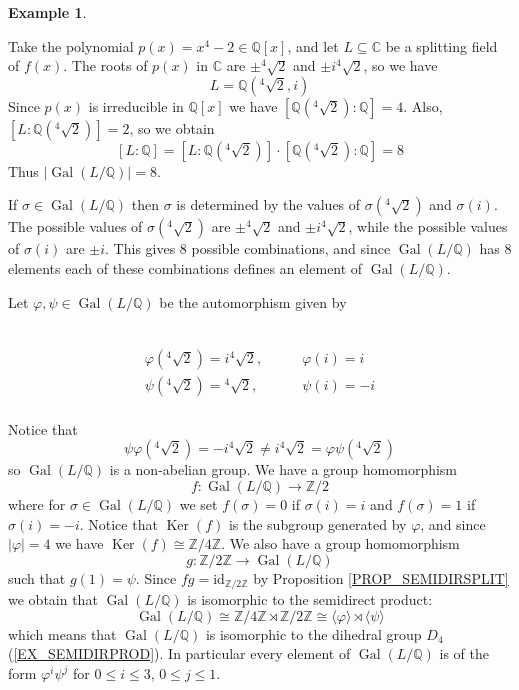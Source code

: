 \documentclass[12pt, letterpaper, oneside]{article}
\theoremstyle{plain}
\theoremstyle{definition}
\newtheorem{example}[theorem]{Example}
\newcommand{\Z}{{\mathbb Z}}
\newcommand{\Q}{{\mathbb Q}}
\newcommand{\C}{{\mathbb C}}
\newcommand{\id}{\mathrm{id}}
\newcommand{\Ker}{\operatorname{Ker}}
\newcommand{\subgp}[1]{\langle#1\rangle}
\newcommand{\Gal}{\operatorname{Gal}}
\newcommand{\vs}{\vskip 5mm}
\begin{document}
\vs\vs

\begin{example} \ 

Take the polynomial $p(x) = x^{4} -2 \in \Q[x]$, and let $L\subseteq \C$ be a splitting field of $f(x)$. 
The roots of $p(x)$ in $\C$ are $\pm ^{4}\!\!\sqrt{2}$ and $\pm i ^{4}\!\!\sqrt{2}$, so we have 
$$L= \Q(^{4}\!\!\sqrt{2}, i)$$
Since $p(x)$ is irreducible in $\Q[x]$ we have $[\Q(^{4}\!\!\sqrt{2}):\Q] =4$. Also, 
$[L : \Q(^{4}\!\!\sqrt{2})] =2$, so we obtain 
$$[L:\Q] = [L : \Q(^{4}\!\!\sqrt{2})] \cdot [\Q(^{4}\!\!\sqrt{2}):\Q] = 8$$
Thus $|\Gal(L/\Q)| = 8$. 

If $\sigma\in \Gal(L/\Q)$ then $\sigma$ is determined by the values of $\sigma( ^{4}\!\!\sqrt{2})$
and $\sigma(i)$. The possible values of $\sigma( ^{4}\!\!\sqrt{2})$ are $\pm  ^{4}\!\!\sqrt{2}$
and $\pm i  ^{4}\!\!\sqrt{2}$, while the possible values of $\sigma(i)$ are $\pm i$. 
This gives 8 possible combinations, and since $\Gal(L/\Q)$ has 8 elements each of these 
combinations defines an element of $\Gal(L/\Q)$. 

Let $\varphi, \psi\in \Gal(L/\Q)$ be the automorphism given by 

\vskip -10mm


\ 
\begin{align*}
\varphi( ^{4}\!\! \sqrt{2}) = i {}^{4}\!\!\sqrt{2}, &\qquad  \varphi(i) = i  \\
\psi( ^{4}\!\!\sqrt{2}) =  {}^{4}\!\!\sqrt{2},   & \qquad  \psi(i) = -i \\
\end{align*}

\vskip -10mm


Notice that 
$$\psi\varphi({}^{4}\!\!\sqrt{2}) = -i {}^{4}\!\!\sqrt{2}\neq i {}^{4}\!\!\sqrt{2} = \varphi\psi({}^{4}\!\!\sqrt{2})$$
so $\Gal(L/\Q)$ is a non-abelian group. We have a group homomorphism 
$$f\colon \Gal(L/\Q) \to \Z/2$$
where for $\sigma \in \Gal(L/\Q)$ we set $f(\sigma) = 0$ if $\sigma(i) = i$ and $f(\sigma) = 1$
if $\sigma(i) =-i$. Notice that $\Ker(f)$ is the subgroup generated by $\varphi$, and since 
$|\varphi| =4$ we have  $\Ker(f)\cong \Z/4\Z$. 
We also have a group homomorphism 
$$g\colon \Z/2\Z\to \Gal(L/\Q)$$ 
such that $g(1) =\psi$. Since $fg = \id_{\Z/2\Z}$ by Proposition \ref{PROP_SEMIDIRSPLIT} we obtain 
that $\Gal(L/\Q)$ is isomorphic to the semidirect product:  
$$\Gal(L/\Q) \cong \Z/4\Z \rtimes \Z/2\Z \cong \subgp{\varphi}\rtimes \subgp{\psi}$$
which means that $\Gal(L/\Q)$ is isomorphic to the dihedral group $D_{4}$ (\ref{EX_SEMIDIRPROD}).
In particular every element of $\Gal(L/\Q)$ is of the form $\varphi^{i}\psi^{j}$ for $0\leq i \leq 3$, 
$0\leq j \leq 1$. 


\end{example}
\end{document}
